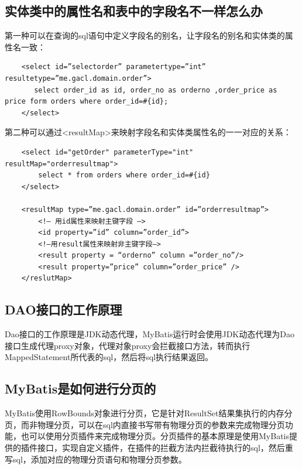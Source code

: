 \documentclass[a4paper]{report}
\begin{document}
\subsection{实体类中的属性名和表中的字段名不一样怎么办}
第一种可以在查询的sql语句中定义字段名的别名，让字段名的别名和实体类的属性名一致：
\begin{verbatim}
    <select id=”selectorder” parametertype=”int” resultetype=”me.gacl.domain.order”>
       select order_id as id, order_no as orderno ,order_price as price form orders where order_id=#{id};
    </select>
\end{verbatim}
第二种可以通过<resultMap>来映射字段名和实体类属性名的一一对应的关系：
\begin{verbatim}
    <select id="getOrder" parameterType="int" resultMap="orderresultmap">
        select * from orders where order_id=#{id}
    </select>

    <resultMap type=”me.gacl.domain.order” id=”orderresultmap”>
        <!– 用id属性来映射主键字段 –>
        <id property=”id” column=”order_id”>
        <!–用result属性来映射非主键字段–>
        <result property = “orderno” column =”order_no”/>
        <result property=”price” column=”order_price” />
    </reslutMap>
\end{verbatim}

\subsection{DAO接口的工作原理}
Dao接口的工作原理是JDK动态代理，MyBatis运行时会使用JDK动态代理为Dao接口生成代理proxy对象，代理对象proxy会拦截接口方法，转而执行MappedStatement所代表的sql，然后将sql执行结果返回。

\subsection{MyBatis是如何进行分页的}
MyBatis使用RowBounds对象进行分页，它是针对ResultSet结果集执行的内存分页，而非物理分页，可以在sql内直接书写带有物理分页的参数来完成物理分页功能，也可以使用分页插件来完成物理分页。分页插件的基本原理是使用MyBatis提供的插件接口，实现自定义插件，在插件的拦截方法内拦截待执行的sql，然后重写sql，添加对应的物理分页语句和物理分页参数。
\end{document}
